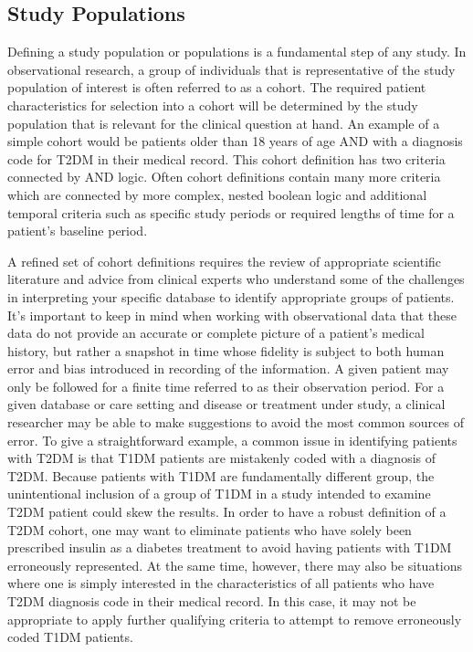 \documentclass[11pt]{book}
\theoremstyle{definition}
\theoremstyle{definition}
\theoremstyle{definition}
\theoremstyle{remark}
\begin{document}
\hypertarget{study-populations}{%
\subsection{Study Populations}\label{study-populations}}

Defining a study population or populations is a fundamental step of any study. In observational research, a group of individuals that is representative of the study population of interest is often referred to as a cohort. The required patient characteristics for selection into a cohort will be determined by the study population that is relevant for the clinical question at hand. An example of a simple cohort would be patients older than 18 years of age AND with a diagnosis code for T2DM in their medical record. This cohort definition has two criteria connected by AND logic. Often cohort definitions contain many more criteria which are connected by more complex, nested boolean logic and additional temporal criteria such as specific study periods or required lengths of time for a patient's baseline period.

A refined set of cohort definitions requires the review of appropriate scientific literature and advice from clinical experts who understand some of the challenges in interpreting your specific database to identify appropriate groups of patients. It's important to keep in mind when working with observational data that these data do not provide an accurate or complete picture of a patient's medical history, but rather a snapshot in time whose fidelity is subject to both human error and bias introduced in recording of the information. A given patient may only be followed for a finite time referred to as their observation period. For a given database or care setting and disease or treatment under study, a clinical researcher may be able to make suggestions to avoid the most common sources of error. To give a straightforward example, a common issue in identifying patients with T2DM is that T1DM patients are mistakenly coded with a diagnosis of T2DM. Because patients with T1DM are fundamentally different group, the unintentional inclusion of a group of T1DM in a study intended to examine T2DM patient could skew the results. In order to have a robust definition of a T2DM cohort, one may want to eliminate patients who have solely been prescribed insulin as a diabetes treatment to avoid having patients with T1DM erroneously represented. At the same time, however, there may also be situations where one is simply interested in the characteristics of all patients who have T2DM diagnosis code in their medical record. In this case, it may not be appropriate to apply further qualifying criteria to attempt to remove erroneously coded T1DM patients.
\end{document}
